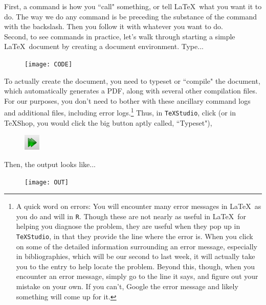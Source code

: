 \documentclass[11pt]{article}
\newcommand{\forceindent}{\leavevmode{\parindent=1.5em\indent}} %
\begin{document}
	First, a command is how you ``call" something, or tell \LaTeX\ what you want it to do. The way we do any command is be preceding the substance of the command with the backslash. Then you follow it with whatever you want to do. \\

	Second, to see commands in practice, let's walk through starting a simple \LaTeX\ document by creating a document environment. Type...

\begin{figure}[!h]
	\texttt{[image: CODE]} %
\end{figure}

	\forceindent To actually create the document, you need to typeset or ``compile" the document, which automatically generates a PDF, along with several other compilation files. For our purposes, you don't need to bother with these ancillary command logs and additional files, including error logs.\footnote{A quick word on errors: You will encounter many error messages in \LaTeX\ as you do and will in \texttt{R}. Though these are not nearly as useful in \LaTeX\ for helping you diagnose the problem, they are useful when they pop up in \texttt{TeXStudio}, in that they provide the line where the error is. When you click on some of the detailed information surrounding an error message, especially in bibliographies, which will be our second to last week, it will actually take you to the entry to help locate the problem. Beyond this, though, when you encounter an error message, simply go to the line it says, and figure out your mistake on your own. If you can't, Google the error message and likely something will come up for it.} Thus, in \texttt{TeXStudio}, click (or in TeXShop, you would click the big button aptly called, ``Typeset"),
	
\begin{figure}[!h]
	\includegraphics[scale=.6]{TYPESET} \\ %
\end{figure}

Then, the output looks like... \\

\begin{figure}[!h]
	\texttt{[image: OUT]} \\ %
\end{figure}
\end{document}

